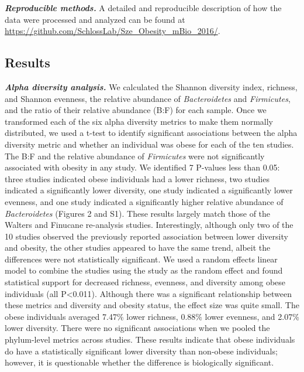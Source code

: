 \documentclass[12pt,]{article}
\begin{document}
\textbf{\emph{Reproducible methods.}} A detailed and reproducible
description of how the data were processed and analyzed can be found at
\url{https://github.com/SchlossLab/Sze_Obesity_mBio_2016/}.

\subsection{Results}\label{results}

\textbf{\emph{Alpha diversity analysis.}} We calculated the Shannon
diversity index, richness, and Shannon evenness, the relative abundance
of \emph{Bacteroidetes} and \emph{Firmicutes}, and the ratio of their
relative abundance (B:F) for each sample. Once we transformed each of
the six alpha diversity metrics to make them normally distributed, we
used a t-test to identify significant associations between the alpha
diversity metric and whether an individual was obese for each of the ten
studies. The B:F and the relative abundance of \emph{Firmicutes} were
not significantly associated with obesity in any study. We identified 7
P-values less than 0.05: three studies indicated obese individuals had a
lower richness, two studies indicated a significantly lower diversity,
one study indicated a significantly lower evenness, and one study
indicated a significantly higher relative abundance of
\emph{Bacteroidetes} (Figures 2 and S1). These results largely match
those of the Walters and Finucane re-analysis studies. Interestingly,
although only two of the 10 studies observed the previously reported
association between lower diversity and obesity, the other studies
appeared to have the same trend, albeit the differences were not
statistically significant. We used a random effects linear model to
combine the studies using the study as the random effect and found
statistical support for decreased richness, evenness, and diversity
among obese individuals (all P\textless{}0.011). Although there was a
significant relationship between these metrics and diversity and obesity
status, the effect size was quite small. The obese individuals averaged
7.47\% lower richness, 0.88\% lower evenness, and 2.07\% lower
diversity. There were no significant associations when we pooled the
phylum-level metrics across studies. These results indicate that obese
individuals do have a statistically significant lower diversity than
non-obese individuals; however, it is questionable whether the
difference is biologically significant.
\end{document}
